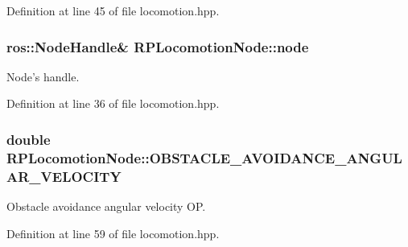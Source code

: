 \-Definition at line 45 of file locomotion.\-hpp.

\hypertarget{class_r_p_locomotion_node_ad07de383fa61683b6dd9c38944e4d33b}{
\subsubsection[{node}]{\setlength{\rightskip}{0pt plus 5cm}ros\-::\-Node\-Handle\& {\bf \-R\-P\-Locomotion\-Node\-::node}}}\label{class_r_p_locomotion_node_ad07de383fa61683b6dd9c38944e4d33b}
\-Node's handle. 

\-Definition at line 36 of file locomotion.\-hpp.

\hypertarget{class_r_p_locomotion_node_abbdfb4df3d7f36c1931d48d49a5ffc30}{
\subsubsection[{\-O\-B\-S\-T\-A\-C\-L\-E\-\_\-\-A\-V\-O\-I\-D\-A\-N\-C\-E\-\_\-\-A\-N\-G\-U\-L\-A\-R\-\_\-\-V\-E\-L\-O\-C\-I\-T\-Y}]{\setlength{\rightskip}{0pt plus 5cm}double {\bf \-R\-P\-Locomotion\-Node\-::\-O\-B\-S\-T\-A\-C\-L\-E\-\_\-\-A\-V\-O\-I\-D\-A\-N\-C\-E\-\_\-\-A\-N\-G\-U\-L\-A\-R\-\_\-\-V\-E\-L\-O\-C\-I\-T\-Y}}}\label{class_r_p_locomotion_node_abbdfb4df3d7f36c1931d48d49a5ffc30}
\-Obstacle avoidance angular velocity \-O\-P. 

\-Definition at line 59 of file locomotion.\-hpp.

